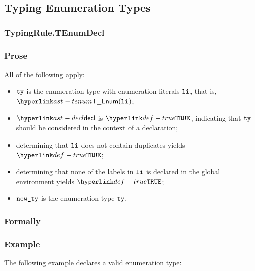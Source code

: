 \subsection{Typing Enumeration Types\label{sec:TypingEnumerationTypes}}
\subsubsection{TypingRule.TEnumDecl\label{sec:TypingRule.TEnumDecl}}

\subsubsection{Prose}
All of the following apply:
\begin{itemize}
  \item $\tty$ is the enumeration type with enumeration literals
    $\vli$, that is, $\TEnum(\vli)$;
  \item $\decl$ is $\True$, indicating that $\tty$ should be considered in the context of a declaration;
  \item determining that $\vli$ does not contain duplicates yields $\True$\ProseOrTypeError;
  \item determining that none of the labels in $\vli$ is declared in the global environment
  yields $\True$\ProseOrTypeError;
  \item $\newty$ is the enumeration type $\tty$.
\end{itemize}
\subsubsection{Formally}
\begin{mathpar}

\end{mathpar}
\subsubsection{Example}
The following example declares a valid enumeration type:

